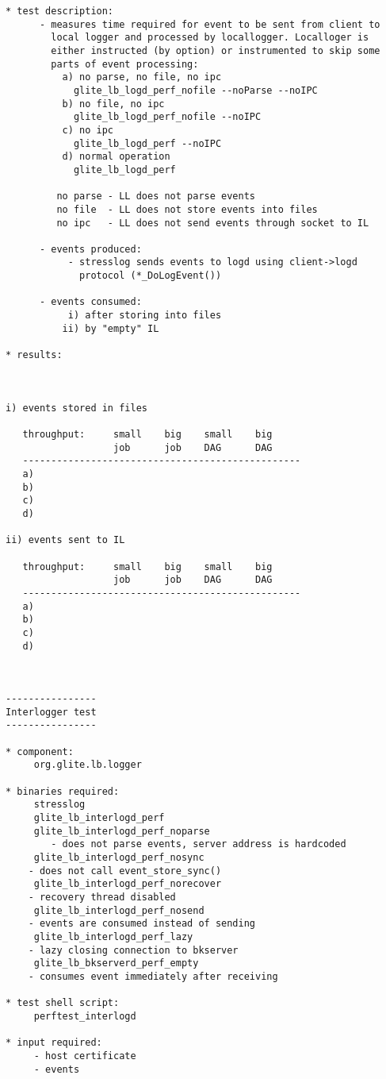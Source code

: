 \documentclass{egee}
\begin{document}
\begin{verbatim}
* test description:
      - measures time required for event to be sent from client to
        local logger and processed by locallogger. Localloger is
        either instructed (by option) or instrumented to skip some
        parts of event processing:
	      a) no parse, no file, no ipc
		    glite_lb_logd_perf_nofile --noParse --noIPC
	      b) no file, no ipc
		    glite_lb_logd_perf_nofile --noIPC
	      c) no ipc
		    glite_lb_logd_perf --noIPC
	      d) normal operation
		    glite_lb_logd_perf

         no parse - LL does not parse events 
         no file  - LL does not store events into files
         no ipc   - LL does not send events through socket to IL

      - events produced:
           - stresslog sends events to logd using client->logd
             protocol (*_DoLogEvent())

      - events consumed:
           i) after storing into files
          ii) by "empty" IL
        
* results:



i) events stored in files

   throughput:     small    big    small    big 
                   job      job    DAG      DAG 
   -------------------------------------------------
   a)
   b)
   c)
   d)

ii) events sent to IL

   throughput:     small    big    small    big 
                   job      job    DAG      DAG 
   -------------------------------------------------
   a)
   b)
   c)
   d)



----------------
Interlogger test
----------------

* component:
     org.glite.lb.logger

* binaries required:
     stresslog
     glite_lb_interlogd_perf
     glite_lb_interlogd_perf_noparse
        - does not parse events, server address is hardcoded
     glite_lb_interlogd_perf_nosync
	- does not call event_store_sync()
     glite_lb_interlogd_perf_norecover
	- recovery thread disabled
     glite_lb_interlogd_perf_nosend
	- events are consumed instead of sending
     glite_lb_interlogd_perf_lazy
	- lazy closing connection to bkserver
     glite_lb_bkserverd_perf_empty
	- consumes event immediately after receiving

* test shell script:
     perftest_interlogd

* input required:
     - host certificate
     - events


\end{verbatim}
\end{document}
